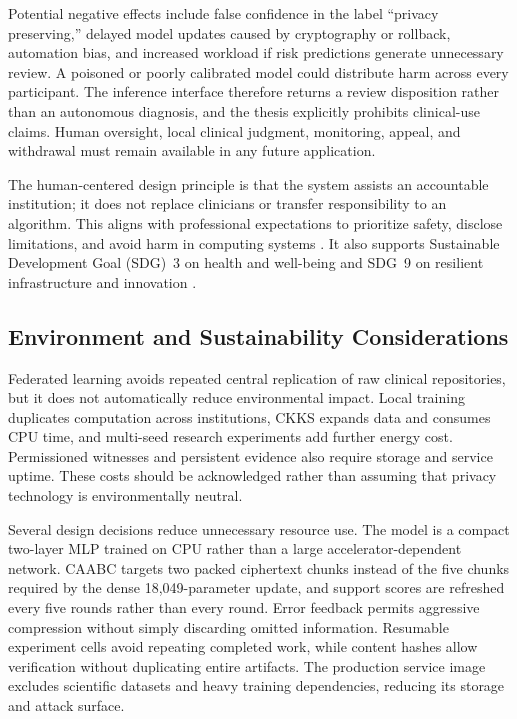 Potential negative effects include false confidence in the label ``privacy preserving,'' delayed model updates caused by cryptography or rollback, automation bias, and increased workload if risk predictions generate unnecessary review. A poisoned or poorly calibrated model could distribute harm across every participant. The inference interface therefore returns a review disposition rather than an autonomous diagnosis, and the thesis explicitly prohibits clinical-use claims. Human oversight, local clinical judgment, monitoring, appeal, and withdrawal must remain available in any future application.

The human-centered design principle is that the system assists an accountable institution; it does not replace clinicians or transfer responsibility to an algorithm. This aligns with professional expectations to prioritize safety, disclose limitations, and avoid harm in computing systems \cite{ieee2026ethics,acm2018ethics}. It also supports Sustainable Development Goal (SDG)~3 on health and well-being and SDG~9 on resilient infrastructure and innovation \cite{un2015sdgs}.

\subsection{Environment and Sustainability Considerations}
\label{subsec:sustainability}

Federated learning avoids repeated central replication of raw clinical repositories, but it does not automatically reduce environmental impact. Local training duplicates computation across institutions, CKKS expands data and consumes CPU time, and multi-seed research experiments add further energy cost. Permissioned witnesses and persistent evidence also require storage and service uptime. These costs should be acknowledged rather than assuming that privacy technology is environmentally neutral.

Several design decisions reduce unnecessary resource use. The model is a compact two-layer MLP trained on CPU rather than a large accelerator-dependent network. CAABC targets two packed ciphertext chunks instead of the five chunks required by the dense 18,049-parameter update, and support scores are refreshed every five rounds rather than every round. Error feedback permits aggressive compression without simply discarding omitted information. Resumable experiment cells avoid repeating completed work, while content hashes allow verification without duplicating entire artifacts. The production service image excludes scientific datasets and heavy training dependencies, reducing its storage and attack surface.

